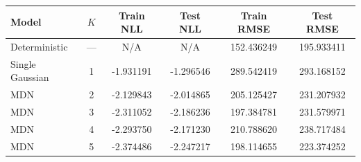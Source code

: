 \begin{tabular}{lccccc}
  \toprule
  Model & $K$ & Train NLL & Test NLL & Train RMSE & Test RMSE \\
  \midrule
  Deterministic & --- & N/A & N/A & 152.436249 & 195.933411 \\
  Single Gaussian & 1 & -1.931191 & -1.296546 & 289.542419 & 293.168152 \\
  MDN & 2 & -2.129843 & -2.014865 & 205.125427 & 231.207932 \\
  MDN & 3 & -2.311052 & -2.186236 & 197.384781 & 231.579971 \\
  MDN & 4 & -2.293750 & -2.171230 & 210.788620 & 238.717484 \\
  MDN & 5 & -2.374486 & -2.247217 & 198.114655 & 223.374252 \\
  \bottomrule
\end{tabular}
